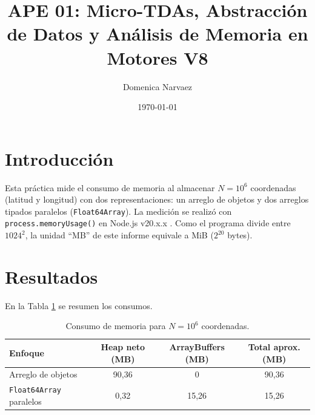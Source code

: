 \documentclass[11pt]{article}
\title{APE 01: Micro-TDAs, Abstracción de Datos y Análisis de Memoria en Motores V8}
\author{Domenica Narvaez}
\affil{Carrera de Computación}
\date{\today}
\newcommand{\nodever}{v20.x.x}    %
\newcommand{\mObj}{90{,}36}       %
\newcommand{\mHeapPrim}{0{,}32}   %
\newcommand{\mBufPrim}{15{,}26}   %
\begin{document}
\maketitle
\thispagestyle{fancy}

\section{Introducción}

Esta práctica mide el consumo de memoria al almacenar $N = 10^6$ coordenadas (latitud y longitud) con dos representaciones: un arreglo de objetos y dos arreglos tipados paralelos (\texttt{Float64Array}). La medición se realizó con \texttt{process.memoryUsage()} en Node.js \nodever{} \parencite{nodememory}. Como el programa divide entre $1024^2$, la unidad ``MB'' de este informe equivale a MiB ($2^{20}$ bytes).

\section{Resultados}

En la Tabla \ref{tab:resultados} se resumen los consumos.

%

\begin{table}[H]
    \centering\small
    \begin{tabular}{@{}lccc@{}}
    \toprule
        \textbf{Enfoque} & \textbf{Heap neto (MB)} & \textbf{ArrayBuffers (MB)} & \textbf{Total aprox. (MB)} \\
    \midrule
        Arreglo de objetos & \mObj & 0 & \mObj \\
        \texttt{Float64Array} paralelos & \mHeapPrim & \mBufPrim & \mBufPrim \\
    \bottomrule
    \end{tabular}
    \caption{Consumo de memoria para $N = 10^6$ coordenadas.}
    \label{tab:resultados}
\end{table}
\end{document}
